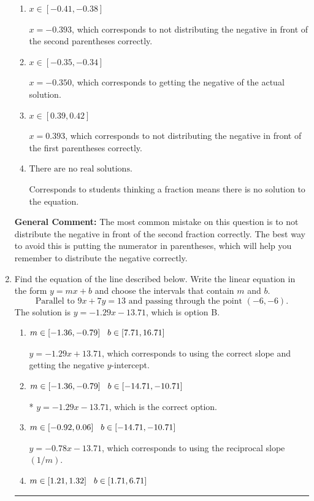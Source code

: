\documentclass{extbook}[14pt]
\newcommand{\litem}[1]{\item #1

\rule{\textwidth}{0.4pt}}
\begin{document}
\begin{enumerate}
{\begin{enumerate}[label=\Alph*.]
* $x = -0.005$, which is the correct option.
\item \( x \in [-0.41, -0.38] \)

$x = -0.393$, which corresponds to not distributing the negative in front of the second parentheses correctly.
\item \( x \in [-0.35, -0.34] \)

$x = -0.350$, which corresponds to getting the negative of the actual solution.
\item \( x \in [0.39, 0.42] \)

$x = 0.393$, which corresponds to not distributing the negative in front of the first parentheses correctly.
\item \( \text{There are no real solutions.} \)

Corresponds to students thinking a fraction means there is no solution to the equation.
\end{enumerate}

\textbf{General Comment:} The most common mistake on this question is to not distribute the negative in front of the second fraction correctly. The best way to avoid this is putting the numerator in parentheses, which will help you remember to distribute the negative correctly.
}
\litem{
Find the equation of the line described below. Write the linear equation in the form $ y=mx+b $ and choose the intervals that contain $m$ and $b$.
\[ \text{Parallel to } 9 x + 7 y = 13 \text{ and passing through the point } (-6, -6). \]The solution is \( y = -1.29x - 13.71 \), which is option B.\begin{enumerate}[label=\Alph*.]
\item \( m \in [-1.36, -0.79] \hspace*{3mm} b \in [7.71, 16.71] \)

 $y = -1.29x + 13.71$, which corresponds to using the correct slope and getting the negative $y$-intercept.
\item \( m \in [-1.36, -0.79] \hspace*{3mm} b \in [-14.71, -10.71] \)

* $y = -1.29x - 13.71$, which is the correct option.
\item \( m \in [-0.92, 0.06] \hspace*{3mm} b \in [-14.71, -10.71] \)

 $y = -0.78x - 13.71$, which corresponds to using the reciprocal slope $(1/m)$.
\item \( m \in [1.21, 1.32] \hspace*{3mm} b \in [1.71, 6.71] \)


\end{enumerate}}
\end{enumerate}
\end{document}
